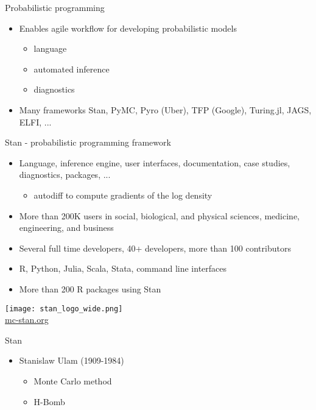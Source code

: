 \documentclass[finnish,english,t]{beamer}
\begin{document}
\begin{frame}{Probabilistic programming}
  
  \begin{itemize}
  \item Enables agile workflow for developing probabilistic models
    \begin{itemize}
    \item language
    \item automated inference
    \item diagnostics
    \end{itemize}
  \item Many frameworks
    Stan, PyMC, Pyro (Uber), TFP (Google), Turing.jl, JAGS, ELFI, ...
  \end{itemize}
  
\end{frame}

\begin{frame}{Stan - probabilistic programming framework}

   \begin{itemize}
   \item Language, inference engine, user interfaces, documentation,
     case studies, diagnostics, packages, ...
     \begin{itemize}
     \item autodiff to compute gradients of the log density
     \end{itemize}
   \item<2-> More than 200K users in social, biological, and
     physical sciences, medicine, engineering, and business
     
   \item<3-> Several full time developers, 40+ developers, more than 100 contributors
   \item<4-> R, Python, Julia, Scala, Stata, command line interfaces
    \item<4-> More than 200 R packages using Stan
   \end{itemize}
  \vfill
  \begin{center}
    \texttt{[image: stan\_logo\_wide.png]}\\
    \url{mc-stan.org}
  \end{center}
\end{frame}

\begin{frame}{Stan}

  \begin{itemize}
  \item Stanislaw Ulam (1909-1984)
    \begin{itemize}
    \item Monte Carlo method
    \item H-Bomb
    \end{itemize}
  \end{itemize}
  
\end{frame}
\end{document}
